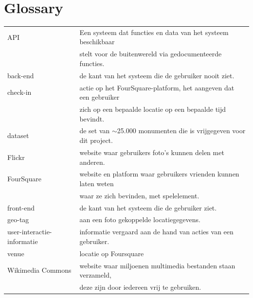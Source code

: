 \documentclass[a4paper,10pt]{article}
\begin{document}
	\clearpage
	\section{Glossary}
		\begin{tabular}{ l | l }
		API & Een systeem dat functies en data van het systeem beschikbaar  \\
			& stelt voor de buitenwereld via gedocumenteerde functies.\\
		back-end & de kant van het systeem die de gebruiker nooit ziet.\\
		check-in& actie op het FourSquare-platform, het aangeven dat een gebruiker  \\
			& zich op een bepaalde locatie op een bepaalde tijd bevindt.\\
		dataset & de set van $\sim$25.000 monumenten die is vrijgegeven voor dit project.\\
		Flickr & website waar gebruikers foto's kunnen delen met anderen.\\
		FourSquare& website en platform waar gebruikers vrienden kunnen laten weten \\
			& waar ze zich bevinden, met spelelement.\\
		front-end & de kant van het systeem die de gebruiker ziet.\\
		geo-tag & aan een foto gekoppelde locatiegegevens.\\
		user-interactie-informatie& informatie vergaard aan de hand van acties van een gebruiker.\\
		venue & locatie op Foursquare\\
		Wikimedia Commons& website waar miljoenen multimedia bestanden staan verzameld, \\
			& deze zijn door iedereen vrij te gebruiken.\\
		\end{tabular}
\end{document}
